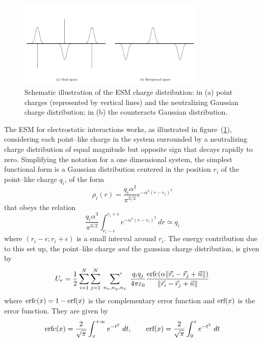 \begin{figure}[!hb]
	\centering
	\includegraphics[width=0.8\textwidth]{./img/EwaldSum/EwaldSum}
	\caption{Schematic illustration of the \acl{ESM} charge distribution: in (a) point charges (represented by vertical lines) and the neutralizing Gaussian charge distribution; in (b) the counteracts Gaussian distribution.}
	\label{fig:ewald}
\end{figure}

The \ac{ESM} for electrostatic interactions works, as illustrated in figure~(\ref{fig:ewald}), considering each point--like charge in the system surrounded by a neutralizing charge distribution of equal magnitude but opposite sign that decays rapidly to zero. Simplifying the notation for a one dimensional system, the simplest functional form is a Gaussian distribution centered in the position $r_i$ of the point--like charge $q_i$, of the form
\begin{equation}
	\rho_i(r) = \frac{q_i\alpha^3}{\pi^{3/2}}e^{-\alpha^2 (r - r_i)^2}
\end{equation}
that obeys the relation
\begin{equation*}
	\frac{q_i\alpha^3}{\pi^{3/2}}\int_{r_i-\epsilon}^{r_i+\epsilon}e^{-\alpha^2 (r - r_i)^2}\ dr \simeq q_i
\end{equation*}
where $(r_i-\epsilon; r_i+\epsilon)$ is a small interval around $r_i$. The energy contribution due to this set up, the point--like charge \textit{and} the gaussian charge distribution, is given by
\begin{equation}
	U_r = \frac{1}{2}\sum_{i=1}^N\sum_{j=1}^N\ \sideset{}{'}\sum_{n_x,n_y,n_z}\ \frac{q_iq_j}{4 \pi \varepsilon_0} \frac{\erfc{(\alpha \| \vec r_i - \vec r_j + \vec n \|)}}{\| \vec r_i - \vec r_j + \vec n \|}
	\label{eq:ewaldReal}
\end{equation}
where $\text{erfc}(x) = 1-\text{erf}(x)$ is the complementary error function and $\text{erf}(x)$ is the error function. They are given by
\begin{equation}
	\text{erfc}(x) = \frac{2}{\sqrt{\pi}}\int_{x}^{+\infty} e^{-t^2}\ dt, \qquad \text{erf}(x) = \frac{2}{\sqrt{\pi}}\int_{0}^{x} e^{-t^2}\ dt
	\label{eq:erf}
\end{equation}

